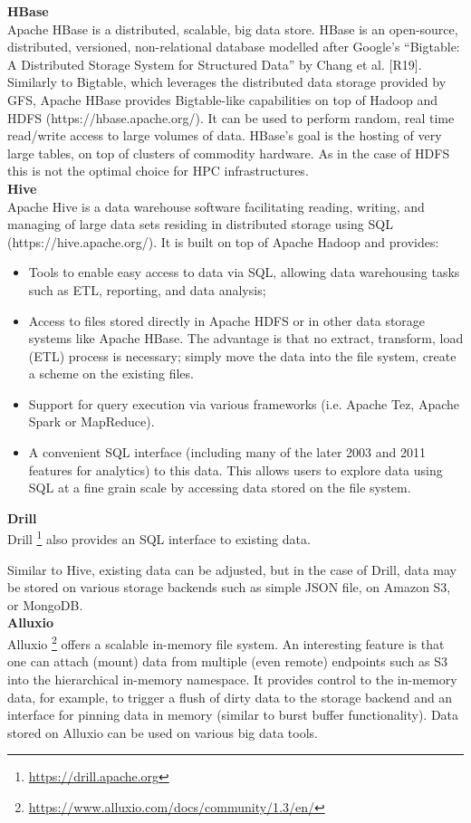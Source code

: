 \textbf{HBase}\\
Apache HBase is a distributed, scalable, big data store.
HBase is an open-source, distributed, versioned, non-relational database modelled after Google's ``Bigtable: A Distributed Storage System for Structured Data'' by Chang et al. [R19]. Similarly to Bigtable, which leverages the distributed data storage provided by GFS, Apache HBase provides Bigtable-like capabilities on top of Hadoop and HDFS (https://hbase.apache.org/).
It can be used to perform random, real time read/write access to large volumes of data. HBase's goal is the hosting of very large tables, on top of clusters of commodity hardware. As in the case of HDFS this is not the optimal choice for HPC infrastructures. \\

\textbf{Hive}\\
Apache Hive is a data warehouse software facilitating reading, writing, and managing of large data sets residing in distributed storage using SQL (https://hive.apache.org/). It is built on top of Apache Hadoop and provides:
\begin{itemize}
	\item Tools to enable easy access to data via SQL, allowing data warehousing tasks such as ETL, reporting, and data analysis;
	\item Access to files stored directly in Apache HDFS or in other data storage systems like Apache HBase.
The advantage is that no extract, transform, load (ETL) process is necessary;
simply move the data into the file system, create a scheme on the existing files.
	\item Support for query execution via various frameworks (i.e. Apache Tez, Apache Spark or MapReduce).
	\item A convenient SQL interface (including many of the later 2003 and 2011 features for analytics) to this data. This allows users to explore data using SQL at a fine grain scale by accessing data stored on the file system.
\end{itemize}

\textbf{Drill}\\
Drill \footnote{\url{https://drill.apache.org}} also provides an SQL interface to existing data.

Similar to Hive, existing data can be adjusted, but in the case of Drill, data may be stored on various storage backends such as simple JSON file, on Amazon S3, or MongoDB.\\

\textbf{Alluxio}\\
Alluxio \footnote{\url{https://www.alluxio.com/docs/community/1.3/en/}} offers a scalable in-memory file system.
An interesting feature is that one can attach (mount) data from multiple (even remote) endpoints such as S3 into the hierarchical in-memory namespace.
It provides control to the in-memory data, for example, to trigger a flush of dirty data to the storage backend and an interface for pinning data in memory (similar to burst buffer functionality).
Data stored on Alluxio can be used on various big data tools.

